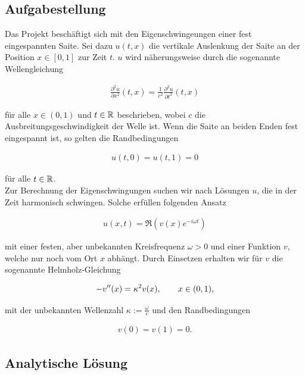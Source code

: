 \subsection{Aufgabestellung}

Das Projekt beschäftigt sich mit den Eigenschwingeungen einer fest eingespannten Saite. Sei dazu $u(t, x)$ die vertikale Auslenkung der Saite an der Position $x \in [0, 1]$ zur Zeit $t$. $u$ wird näherungsweise durch die sogenannte Wellengleichung

\begin{align} \label{Wellengleichung}
  \frac{\partial^2 u}{\partial x^2} (t, x) =
  \frac{1}{c^2}
  \frac{\partial^2 u}{\partial t^2} (t, x)
\end{align}

für alle $x \in (0, 1)$ und $t \in \mathbb{R}$ beschrieben, wobei $c$ die Ausbreitungsgeschwindigkeit der Welle ist. Wenn die Saite an beiden Enden fest eingespannt ist, so gelten die Randbedingungen

\begin{align*}
  u(t, 0) = u(t, 1) = 0
\end{align*}

für alle $t \in \mathbb{R}$. \\

Zur Berechnung der Eigenschwingungen suchen wir nach Lösungen $u$, die in der Zeit harmonisch schwingen. Solche erfüllen folgenden Ansatz

\begin{align*}
  u(x, t) = \mathfrak{R} (v(x) e^{-i \omega t})
\end{align*}

mit einer festen, aber unbekannten Kreisfrequenz $\omega > 0$ und einer Funktion $v$, welche nur noch vom Ort $x$ abhängt. Durch Einsetzen erhalten wir für $v$ die sogenannte Helmholz-Gleichung

\begin{align} \label{Helmholz-Gleichung}
  -v^{\prime \prime}(x) = \kappa^2 v(x), \qquad
  x \in (0, 1),
\end{align}

mit der unbekannten Wellenzahl $\kappa := \frac{\omega}{c}$ und den Randbedingungen

\begin{align} \label{Randbedingungen}
  v(0) = v(1) = 0.
\end{align}

\subsection{Analytische Lösung}

